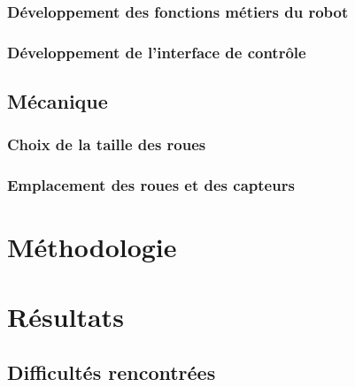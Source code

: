 \documentclass[a4paper, 12pt]{report}
\begin{document}
\subsection{Développement des fonctions métiers du robot}

\subsection{Développement de l'interface de contrôle}
\section{Mécanique}
\subsection{Choix de la taille des roues}
\subsection{Emplacement des roues et des capteurs}

\chapter{Méthodologie}
\lipsum[5-6]

\chapter{Résultats}
\lipsum[7-8]
\section{Difficultés rencontrées}
\end{document}
